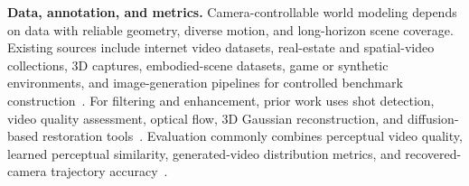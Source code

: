 \noindent\textbf{Data, annotation, and metrics.}
Camera-controllable world modeling depends on data with reliable geometry, diverse motion, and long-horizon scene coverage.
Existing sources include internet video datasets, real-estate and spatial-video collections, 3D captures, embodied-scene datasets, game or synthetic environments, and image-generation pipelines for controlled benchmark construction~\citep{realestate10k,dl3dv,spatialvid,miradata,omniworld,sekai,google2025nanobananapro}.
For filtering and enhancement, prior work uses shot detection, video quality assessment, optical flow, 3D Gaussian reconstruction, and diffusion-based restoration tools~\citep{transnetv2,dover,unimatch,fcgs,difix3d}.
Evaluation commonly combines perceptual video quality, learned perceptual similarity, generated-video distribution metrics, and recovered-camera trajectory accuracy~\citep{vbench,lpips,unterthiner2018towards,pi3x,umeyama}.
